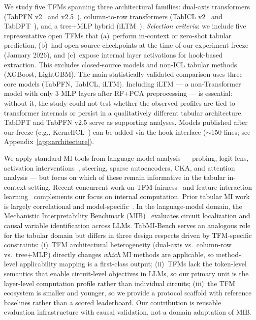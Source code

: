 \documentclass{article}
\begin{document}
We study five TFMs spanning three architectural families: dual-axis transformers (TabPFN v2~\cite{hollmann2025tabpfn} and v2.5~\cite{priorlabs2025tabpfn25}), column-to-row transformers (TabICL v2~\cite{qu2025tabicl} and TabDPT~\cite{somboonvorakul2024tabdpt}), and a tree+MLP hybrid (iLTM~\cite{ye2025iltm}). \textit{Selection criteria}: we include five representative open TFMs that (a)~perform in-context or zero-shot tabular prediction, (b)~had open-source checkpoints at the time of our experiment freeze (January 2026), and (c)~expose internal layer activations for hook-based extraction. This excludes closed-source models and non-ICL tabular methods (XGBoost, LightGBM). The main statistically validated comparison uses three core models (TabPFN, TabICL, iLTM). Including iLTM --- a non-Transformer model with only 3 MLP layers after RF+PCA preprocessing --- is essential: without it, the study could not test whether the observed profiles are tied to transformer internals or persist in a qualitatively different tabular architecture. TabDPT and TabPFN v2.5 serve as supporting analyses. Models published after our freeze (e.g., KernelICL~\cite{miftachov2026kernelicl}) can be added via the hook interface ($\sim$150 lines; see Appendix~\ref{app:architecture}).

We apply standard MI tools from language-model analysis --- probing, logit lens, activation interventions~\cite{turner2023activation}, steering, sparse autoencoders, CKA, and attention analysis --- but focus on which of these remain informative in the tabular in-context setting. Recent concurrent work on TFM fairness~\cite{kenfack2025fairness} and feature interaction learning~\cite{karabulut2026association} complements our focus on internal computation. Prior tabular MI work is largely correlational and model-specific~\cite{gupta2026tabpfn,balef2025layers}. In the language-model domain, the Mechanistic Interpretability Benchmark (MIB)~\cite{mueller2025mib} evaluates circuit localization and causal variable identification across LLMs. TabMI-Bench serves an analogous role for the tabular domain but differs in three design respects driven by TFM-specific constraints: (i)~TFM architectural heterogeneity (dual-axis vs.\ column-row vs.\ tree+MLP) directly changes \textit{which} MI methods are applicable, so method-level applicability mapping is a first-class output; (ii)~TFMs lack the token-level semantics that enable circuit-level objectives in LLMs, so our primary unit is the layer-level computation profile rather than individual circuits; (iii)~the TFM ecosystem is smaller and younger, so we provide a protocol scaffold with reference baselines rather than a scored leaderboard. Our contribution is reusable evaluation infrastructure with causal validation, not a domain adaptation of MIB.
\end{document}
